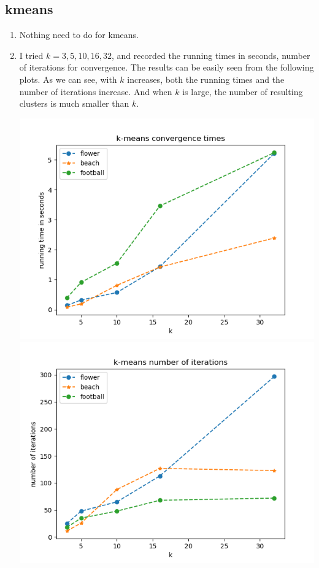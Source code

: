 \documentclass[twoside,10pt]{article}
\begin{document}
\subsection{kmeans}
\begin{enumerate}
    \item Nothing need to do for kmeans.
    \item I tried $k = 3,5,10,16,32$, and recorded the running times in seconds, number of iterations for convergence. The results can be easily seen from the following plots. As we can see, with $k$ increases, both the running times and the number of iterations increase. And when $k$ is large, the number of resulting clusters is much smaller than $k$. 

    \begin{center}\includegraphics[scale=0.5]{kmeans_times.png}\includegraphics[scale=0.5]{kmeans_iters.png}\end{center}

\end{enumerate}
\end{document}

